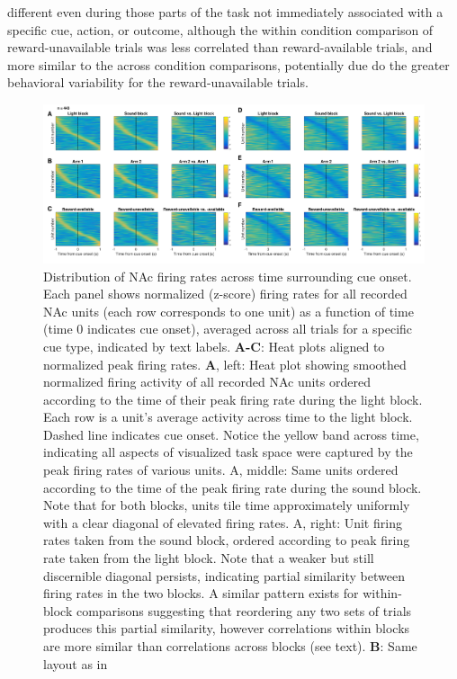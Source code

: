 \documentclass[11pt]{article}
\newcommand{\bsf}[1]{\textbf{#1}}
\begin{document}
{different even during those parts of the task not immediately associated with a
specific cue, action, or outcome, although the within condition comparison of
reward-unavailable trials was less correlated than reward-available trials, and
more similar to the across condition comparisons, potentially due do the greater behavioral variability for the reward-unavailable trials.

\begin{figure}[h]
\centering
\includegraphics[width=\textwidth]{Fig 8 - Task tiling.png}
\caption{Distribution of NAc firing rates across time surrounding cue
onset. Each panel shows normalized (z-score) firing rates for all recorded NAc
units (each row corresponds to one unit) as a function of time (time 0
indicates cue onset), averaged across all trials for a specific cue type,
indicated by text labels. \bsf{A-C}: Heat plots aligned to normalized peak
firing rates. \bsf{A}, left: Heat plot showing smoothed normalized firing
activity of all recorded NAc units ordered according to the time of their peak
firing rate during the light block. Each row is a unit’s average activity
across time to the light block. Dashed line indicates cue onset. Notice the
yellow band across time, indicating all aspects of visualized task space were
captured by the peak firing rates of various units. A, middle: Same units
ordered according to the time of the peak firing rate during the sound
block. Note that for both blocks, units tile time approximately uniformly with
a clear diagonal of elevated firing rates. A, right: Unit firing rates
taken from the sound block, ordered according to peak firing rate taken from
the light block. Note that a weaker but still discernible diagonal persists,
indicating partial similarity between firing rates in the two blocks. A similar pattern exists for within-block comparisons suggesting that reordering any two sets of trials
produces this partial similarity, however correlations within blocks are more
similar than correlations across blocks (see text). \bsf{B}: Same layout as in
}
\end{figure}}
\end{document}

